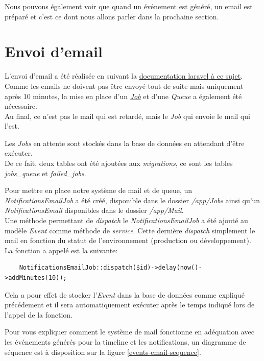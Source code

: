 \documentclass[
    iai, %
    il, %
]{heig-tb}
\begin{document}
Nous pouvons également voir que quand un événement est généré, un email est préparé et c'est ce dont nous allons parler dans la prochaine section.

\section{Envoi d'email}
L'envoi d'email a été réalisée en suivant la \href{https://laravel.com/docs/9.x/mail}{documentation \Gls{laravel} à ce sujet}. \\
Comme les emails ne doivent pas être envoyé tout de suite mais uniquement après 10 minutes, la mise en place d'un \href{https://laravel.com/docs/9.x/queues#creating-jobs}{\emph{Job}} et d'une \emph{Queue} a également été nécessaire. \\
Au final, ce n'est pas le mail qui est retardé, mais le \emph{Job} qui envoie le mail qui l'est.

Les \emph{Jobs} en attente sont stockés dans la base de données en attendant d'être exécuter. \\
De ce fait, deux tables ont été ajoutées aux \emph{migrations}, ce sont les tables \emph{jobs\_queue} et \emph{failed\_jobs}.

Pour mettre en place notre système de mail et de queue, un \emph{NotificationsEmailJob} a été créé, disponible dans le dossier \emph{/app/Jobs} ainsi qu'un \emph{NotificationsEmail} disponibles dans le dossier \emph{/app/Mail}. \\
Une méthode permettant de \emph{dispatch} le \emph{NotificationsEmailJob} a été ajouté au modèle \emph{Event} comme méthode de \emph{service}. Cette dernière \emph{dispatch} simplement le mail en fonction du statut de l'environnement (production ou développement). \\
La fonction a appelé est la suivante:
\begin{lstlisting}
    NotificationsEmailJob::dispatch($id)->delay(now()->addMinutes(10));
\end{lstlisting}

Cela a pour effet de stocker l'\emph{Event} dans la base de données comme expliqué précédement et il sera automatiquement exécuter après le temps indiqué lors de l'appel de la fonction.

Pour vous expliquer comment le système de mail fonctionne en adéquation avec les événements générés pour la timeline et les notifications, un diagramme de séquence est à disposition sur la figure \ref{events-email-sequence}.
\end{document}
